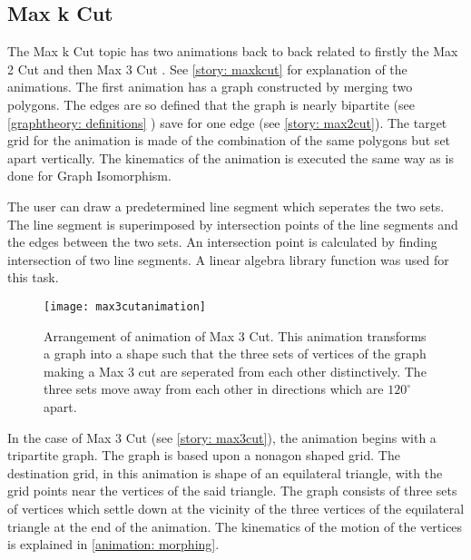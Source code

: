 \subsection{Max k Cut}
\label{impl: maxkcut}
The Max k Cut topic has two animations back to back related to firstly the Max
2 Cut and then Max 3 Cut . See \autoref{story: maxkcut} for explanation of the
animations. The first animation has a graph constructed by merging two polygons.
The edges are so defined that the graph is nearly bipartite (see
\autoref{graphtheory: definitions} ) save for one edge (see \autoref{story:
max2cut}). The target grid for the animation is made of the combination of the
same polygons but set apart vertically. The kinematics of the animation is
executed the same way as is done for Graph Isomorphism.

The user can draw a predetermined line segment which seperates the two
sets. The line segment is superimposed by intersection points of the
line segments and the edges between the two sets. An intersection point
is calculated by finding intersection of two line segments. A linear algebra
library function was used for this task.


\begin{figure}[h]
\centering
\texttt{[image: max3cutanimation]}
\caption{
        Arrangement of animation of Max 3 Cut. This animation transforms a graph
        into a shape such that the three sets of vertices of the graph making a Max 3 cut
        are seperated from each other distinctively. The three sets move away from each
        other in directions which are $120^{\circ}$ apart.
        }
\label{animationfigure: max3cut}
\end{figure}
In the case of Max 3 Cut (see \autoref{story: max3cut}), the animation begins
with a tripartite graph. The graph is based upon a nonagon shaped grid. The
destination grid, in this animation is shape of an equilateral triangle, with
the grid points near the vertices of the said triangle. The graph consists of
three sets of vertices which settle down at the vicinity of the three vertices
of the equilateral triangle at the end of the animation. The kinematics of the
motion of the vertices is explained in \autoref{animation: morphing}.


